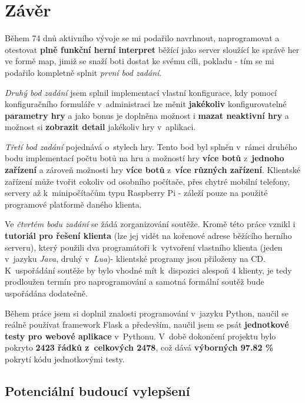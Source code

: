 \section*{Závěr}
\label{sec:ending}

{\sloppy
Během 74 dnů aktivního vývoje se mi podařilo navrhnout, naprogramovat a otestovat \textbf{plně funkční herní interpret} běžící jako server sloužící ke správě her ve formě map, jimiž se snaží boti dostat ke svému cíli, pokladu - tím se mi podařilo kompletně splnit \emph{první bod zadání}.

\emph{Druhý bod zadání} jsem splnil implementací vlastní konfigurace, kdy pomocí konfiguračního formuláře v~administraci lze měnit \textbf{jakékoliv} konfigurovatelné \textbf{parametry hry} a jako bonus je doplněna možnost i \textbf{mazat neaktivní hry} a možnost si \textbf{zobrazit detail} jakékoliv hry v~aplikaci.

\emph{Třetí bod zadání} pojednává o~stylech hry. Tento bod byl splněn v~rámci druhého bodu implementací počtu botů na hru a možností hry \textbf{více botů} z~\textbf{jednoho zařízení} a zároveň možnosti hry \textbf{více botů} z~\textbf{více různých zařízení}. Klientské zařízení může tvořit cokoliv od osobního počítače, přes chytré mobilní telefony, servery až k~minipočítačům typu Raspberry Pi - záleží pouze na použité programové platformě daného klienta.

Ve \emph{čtvrtém bodu zadání} se žádá zorganizování soutěže. Kromě této práce vznikl i \textbf{tutoriál pro řešení klienta} (lze jej vidět na kořenové adrese běžícího herního serveru), který použili dva programátoři k~vytvoření vlastního klienta (jeden v~jazyku \emph{Java}, druhý v~\emph{Lua})- klientské programy jsou přiloženy na CD. K~uspořádání soutěže by bylo vhodné mít k~dispozici alespoň 4 klienty, je tedy prodloužen termín pro naprogramování a samotná formální soutěž bude uspořádána dodatečně.

Během práce jsem si doplnil znalosti programování v~jazyku Python, naučil se reálně používat framework Flask a především, naučil jsem se psát \textbf{jednotkové testy pro webové aplikace} v~Pythonu. V~době dokončení projektu bylo pokryto \textbf{2423 řádků z~celkových 2478}, což dává \textbf{výborných 97.82 \%} pokrytí kódu jednotkovými testy.

\subsection*{Potenciální budoucí vylepšení}

}
